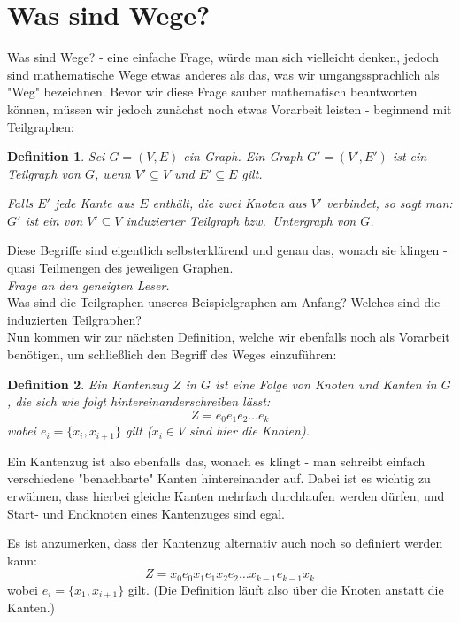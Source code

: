 \documentclass{article}
\newtheorem{definition}{Definition}
\begin{document}
\section{Was sind Wege?}
Was sind Wege? - eine einfache Frage, würde man sich vielleicht denken, jedoch sind mathematische Wege etwas anderes als das, was wir umgangssprachlich als "Weg" bezeichnen. Bevor wir diese Frage sauber mathematisch beantworten können, müssen wir jedoch zunächst noch etwas Vorarbeit leisten - beginnend mit Teilgraphen:\\
\begin{definition}
	Sei $G = (V, E)$ ein Graph. Ein Graph $G' = (V', E')$ ist ein \emph{Teilgraph} von $G$, wenn $V' \subseteq V$ und $E' \subseteq E$ gilt.
		\par\bigskip
	Falls $E'$ jede Kante aus $E$ enthält, die zwei Knoten aus $V'$ verbindet, so sagt man: $G'$ ist ein von $V' \subseteq V$ \emph{induzierter Teilgraph} bzw.\ \emph{Untergraph} von $G$.
\end{definition}
Diese Begriffe sind eigentlich selbsterklärend und genau das, wonach sie klingen - quasi Teilmengen des jeweiligen Graphen.\\
\bigskip
\emph{Frage an den geneigten Leser.}\\
Was sind die Teilgraphen unseres Beispielgraphen am Anfang? Welches sind die induzierten Teilgraphen?\\
\bigskip
Nun kommen wir zur nächsten Definition, welche wir ebenfalls noch als Vorarbeit benötigen, um schließlich den Begriff des Weges einzuführen:\\
\begin{definition}
	Ein \emph{Kantenzug $Z$} in $G$ ist eine Folge von Knoten und Kanten in $G$, die sich wie folgt hintereinanderschreiben lässt:
	 \begin{equation*}
		Z = e_0e_1e_2 \ldots e_k
	\end{equation*}
	 wobei $e_i = \{x_i, x_{i+1}\}$ gilt ($x_i \in V$ sind hier die Knoten).
\end{definition}
\bigskip
Ein Kantenzug ist also ebenfalls das, wonach es klingt - man schreibt einfach verschiedene "benachbarte" Kanten hintereinander auf. Dabei ist es wichtig zu erwähnen, dass hierbei gleiche Kanten mehrfach durchlaufen werden dürfen, und Start- und Endknoten eines Kantenzuges sind egal.\\
\begin{small}
	\begin{emph}
		Es ist anzumerken, dass der Kantenzug alternativ auch noch so definiert werden kann:\\
		\begin{equation*}
			Z = x_0e_0x_1e_1x_2e_2 \ldots x_{k-1}e_{k-1}x_k
		\end{equation*}
		wobei $e_i = \{x_1, x_{i+1}\}$ gilt. (Die Definition läuft also über die Knoten anstatt die Kanten.)
	\end{emph}
\end{small}
\end{document}

